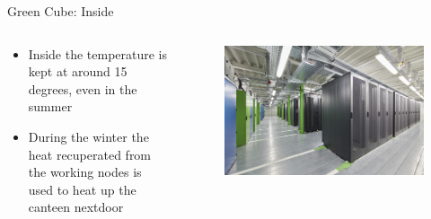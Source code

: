 \begin{frame}{Green Cube: Inside}
    \begin{columns}
        \begin{column}{0.5\textwidth}
            \begin{itemize}
                \item Inside the temperature is kept at around 15 degrees, even in the summer
                \item During the winter the heat recuperated from the working nodes is used to heat up the canteen nextdoor
            \end{itemize}
        \end{column}
        \begin{column}{0.5\textwidth}
            \begin{figure}
                \centering
                \includegraphics[width=\textwidth]{images/gsi_green_cube_inside.jpg}
            \end{figure}
        \end{column}
    \end{columns}
\end{frame}

